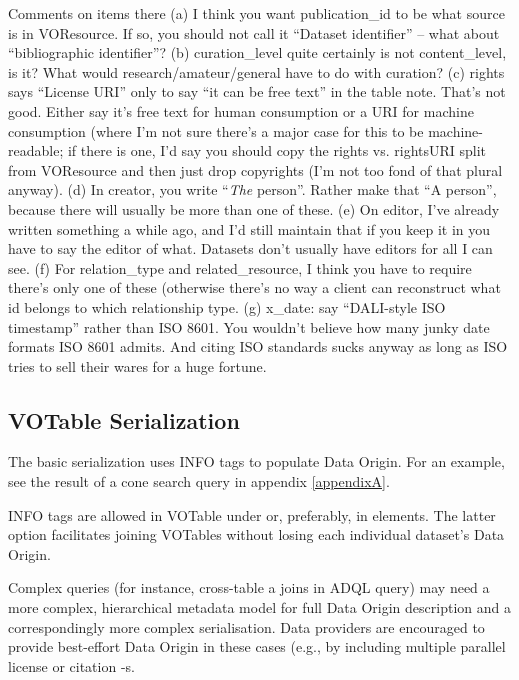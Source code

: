 \documentclass[11pt,a4paper]{ivoa}
\begin{document}
Comments on items there 
(a) I think you want publication\_id to be what source is in VOResource.  If so, you should not call it ``Dataset identifier'' -- what about ``bibliographic identifier''?
(b)  curation\_level quite certainly is not content\_level, is it?  What would research/amateur/general have to do with curation?
(c) rights says ``License URI'' only to say ``it can be free text'' in the table note.  That's not good.  Either say it's free text for human consumption or a URI for machine consumption (where I'm not sure there's a major case for this to be machine-readable; if there is one, I'd say you should copy the rights vs. rightsURI split from VOResource and then just drop copyrights (I'm not too fond of that plural anyway).
(d) In creator, you write ``\textit{The} person''.  Rather make that ``A person'', because there will usually be more than one of these.
(e) On editor, I've already written something a while ago, and I'd still maintain that if you keep it in you have to say the editor of what.  Datasets don't usually have editors for all I can see.
(f) For relation\_type and related\_resource, I think you have to require there's only one of these (otherwise there's no way a client can reconstruct what id belongs to which relationship type.
(g) x\_date: say ``DALI-style ISO timestamp'' rather than ISO 8601.  You wouldn't believe how many junky date formats ISO 8601 admits.  And citing ISO standards sucks anyway as long as ISO tries to sell their wares for a huge fortune.

\subsection{VOTable Serialization}

The basic serialization uses INFO tags to populate Data Origin.  For an example, see the result of a cone search \citep{2008ivoa.specQ0222P} query in appendix  \ref{appendixA}.

INFO tags are allowed in VOTable under  or, preferably, in  elements.
The latter option facilitates joining VOTables without losing each individual dataset's Data Origin.

Complex queries (for instance, cross-table a joins in ADQL query) may need a more complex, hierarchical metadata model for full Data Origin description and a correspondingly more complex serialisation.  Data providers are encouraged to provide best-effort Data Origin in these cases (e.g., by including multiple parallel license or citation -s.
\end{document}
